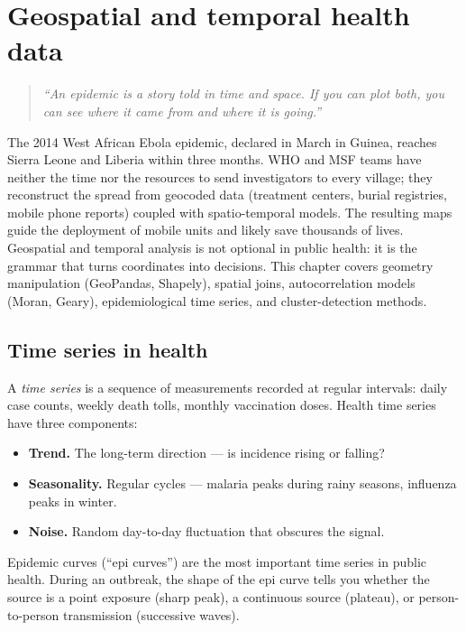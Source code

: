 \chapter{Geospatial and temporal health data}
\label{ch:geospatial-temporal}

\begin{quote}
\emph{``An epidemic is a story told in time and space. If you can plot both, you can see where it came from and where it is going.''}
\end{quote}

The 2014 West African Ebola epidemic, declared in March in Guinea, reaches Sierra Leone and Liberia within three months. WHO and MSF teams have neither the time nor the resources to send investigators to every village; they reconstruct the spread from geocoded data (treatment centers, burial registries, mobile phone reports) coupled with spatio-temporal models. The resulting maps guide the deployment of mobile units and likely save thousands of lives. Geospatial and temporal analysis is not optional in public health: it is the grammar that turns coordinates into decisions. This chapter covers geometry manipulation (GeoPandas, Shapely), spatial joins, autocorrelation models (Moran, Geary), epidemiological time series, and cluster-detection methods.

\section{Time series in health}

A \emph{time series} is a sequence of measurements recorded at regular intervals: daily case counts, weekly death tolls, monthly vaccination doses. Health time series have three components:

\begin{itemize}
  \item \textbf{Trend.} The long-term direction --- is incidence rising or falling?
  \item \textbf{Seasonality.} Regular cycles --- malaria peaks during rainy seasons, influenza peaks in winter.
  \item \textbf{Noise.} Random day-to-day fluctuation that obscures the signal.
\end{itemize}

\begin{clinicalnote}
Epidemic curves (``epi curves'') are the most important time series in public health. During an outbreak, the shape of the epi curve tells you whether the source is a point exposure (sharp peak), a continuous source (plateau), or person-to-person transmission (successive waves).
\end{clinicalnote}

